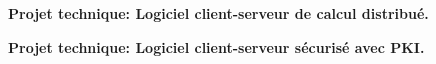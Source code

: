 \documentclass[10pt,a4paper]{.altacv}
\begin{document}

\textbf{\large Projet technique: Logiciel client-serveur de calcul distribué.}

\divider

\textbf{\large Projet technique: Logiciel client-serveur sécurisé avec PKI.}








\end{document}
